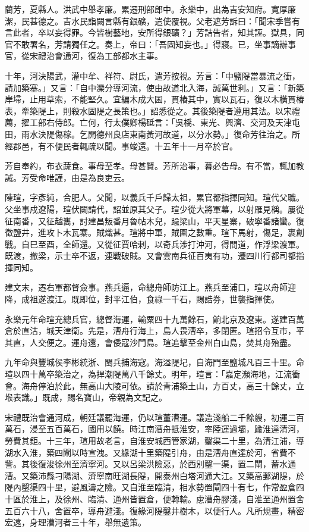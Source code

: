 \begin{pinyinscope}
藺芳，夏縣人。洪武中舉孝廉。累遷刑部郎中。永樂中，出為吉安知府。寬厚廉潔，民甚德之。吉水民詣闕言縣有銀礦，遣使覆視。父老遮芳訴曰：「聞宋季嘗有言此者，卒以妄得罪。今皆樹藝地，安所得銀礦？」芳詰告者，知其誣。獄具，同官不敢署名，芳請獨任之。奏上，帝曰：「吾固知妄也。」得寢。已，坐事謫辦事官，從宋禮治會通河，復為工部都水主事。

十年，河決陽武，灌中牟、祥符、尉氏，遣芳按視。芳言：「中鹽隄當暴流之衝，請加築塞。」又言：「自中灤分導河流，使由故道北入海，誠萬世利。」又言：「新築岸埽，止用草索，不能堅久。宜編木成大囷，貫樁其中，實以瓦石，復以木橫貫樁表，牽築隄上，則殺水固隄之長策也。」詔悉從之。其後築隄者遵用其法。以宋禮薦，擢工部右侍郎。亡何，行太僕卿楊砥言：「吳橋、東光、興濟、交河及天津屯田，雨水決隄傷稼。乞開德州良店東南黃河故道，以分水勢。」復命芳往治之。所經郡邑，有不便民者輒疏以聞。事竣還。十五年十一月卒於官。

芳自奉約，布衣蔬食。事母至孝。母甚賢。芳所治事，暮必告母。有不當，輒加教誡。芳受命唯謹，由是為良吏云。

陳瑄，字彥純，合肥人。父聞，以義兵千戶歸太祖，累官都指揮同知。瑄代父職。父坐事戍遼陽，瑄伏闕請代，詔並原其父子。瑄少從大將軍幕，以射雁見稱。屢從征南番，又征越巂，討建昌叛番月魯帖木兒，踰梁山，平天星寨，破寧番諸蠻。復徵鹽井，進攻卜木瓦寨。賊熾甚。瑄將中軍，賊圍之數重。瑄下馬射，傷足，裹創戰。自巳至酉，全師還。又從征賈哈剌，以奇兵涉打沖河，得間道，作浮梁渡軍。既渡，撤梁，示士卒不返，連戰破賊。又會雲南兵征百夷有功，遷四川行都司都指揮同知。

建文末，遷右軍都督僉事。燕兵逼，命總舟師防江上。燕兵至浦口，瑄以舟師迎降，成祖遂渡江。既即位，封平江伯，食祿一千石，賜誥券，世襲指揮使。

永樂元年命瑄充總兵官，總督海運，輸粟四十九萬餘石，餉北京及遼東。遂建百萬倉於直沽，城天津衛。先是，漕舟行海上，島人畏漕卒，多閉匿。瑄招令互市，平其直，人交便之。運舟還，會倭寇沙門島。瑄追擊至金州白山島，焚其舟殆盡。

九年命與豐城侯李彬統浙、閩兵捕海寇。海溢隄圮，自海門至鹽城凡百三十里。命瑄以四十萬卒築治之，為捍潮隄萬八千餘丈。明年，瑄言：「嘉定瀕海地，江流衝會。海舟停泊於此，無高山大陵可依。請於青浦築土山，方百丈，高三十餘丈，立堠表識。」既成，賜名寶山，帝親為文記之。

宋禮既治會通河成，朝廷議罷海運，仍以瑄董漕運。議造淺船二千餘艘，初運二百萬石，浸至五百萬石，國用以饒。時江南漕舟抵淮安，率陸運過壩，踰淮達清河，勞費其鉅。十三年，瑄用故老言，自淮安城西管家湖，鑿渠二十里，為清江浦，導湖水入淮，築四閘以時宣洩。又緣湖十里築隄引舟，由是漕舟直達於河，省費不訾。其後復浚徐州至濟寧河。又以呂梁洪險惡，於西別鑿一渠，置二閘，蓄水通漕。又築沛縣刁陽湖、濟寧南旺湖長隄，開泰州白塔河通大江。又築高郵湖隄，於隄內鑿渠四十里，避風濤之險。又自淮至臨清，相水勢置閘四十有七，作常盈倉四十區於淮上，及徐州、臨清、通州皆置倉，便轉輸。慮漕舟膠淺，自淮至通州置舍五百六十八，舍置卒，導舟避淺。復緣河隄鑿井樹木，以便行人。凡所規畫，精密宏遠，身理漕河者三十年，舉無遺策。


\end{pinyinscope}
